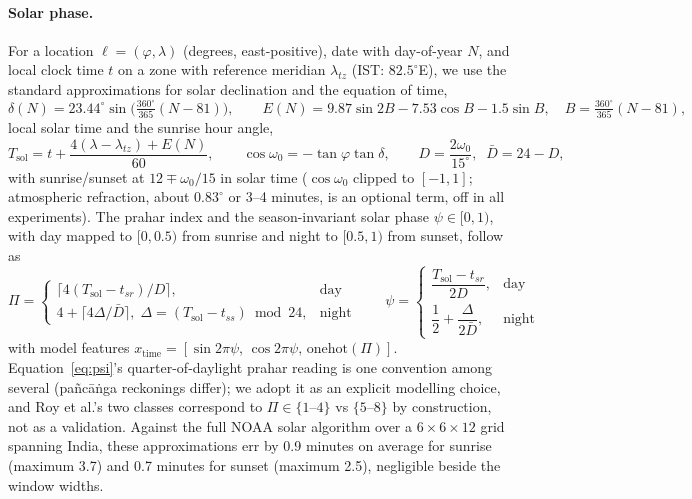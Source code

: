 \documentclass[11pt]{article}
\begin{document}
\paragraph{Solar phase.}
For a location $\ell = (\varphi, \lambda)$ (degrees, east-positive), date
with day-of-year $N$, and local clock time $t$ on a zone with reference
meridian $\lambda_{tz}$ (IST: $82.5^\circ$E), we use the standard
approximations for solar declination and the equation of time,
\begin{equation}
\delta(N)=23.44^{\circ}\sin\!\Big(\tfrac{360^{\circ}}{365}(N-81)\Big),
\qquad
E(N)=9.87\sin 2B-7.53\cos B-1.5\sin B,
\quad B=\tfrac{360^{\circ}}{365}(N-81),
\label{eq:decl}
\end{equation}
local solar time and the sunrise hour angle,
\begin{equation}
T_{\mathrm{sol}}=t+\frac{4(\lambda-\lambda_{tz})+E(N)}{60},
\qquad
\cos\omega_0=-\tan\varphi\tan\delta,
\qquad
D=\frac{2\omega_0}{15^{\circ}},\;\;\bar D=24-D,
\label{eq:sun}
\end{equation}
with sunrise/sunset at $12 \mp \omega_0/15$ in solar time ($\cos\omega_0$
clipped to $[-1,1]$; atmospheric refraction, about $0.83^\circ$ or 3--4
minutes, is an optional term, off in all experiments). The prahar index and
the season-invariant solar phase $\psi \in [0,1)$, with day mapped to
$[0,0.5)$ from sunrise and night to $[0.5,1)$ from sunset, follow as
\begin{equation}
\Pi=\begin{cases}
\big\lceil 4(T_{\mathrm{sol}}-t_{sr})/D\big\rceil, & \text{day}\\[2pt]
4+\big\lceil 4\Delta/\bar D\big\rceil,\;
\Delta=(T_{\mathrm{sol}}-t_{ss})\bmod 24, & \text{night}
\end{cases}
\qquad
\psi=\begin{cases}
\dfrac{T_{\mathrm{sol}}-t_{sr}}{2D}, & \text{day}\\[6pt]
\dfrac12+\dfrac{\Delta}{2\bar D}, & \text{night}
\end{cases}
\label{eq:psi}
\end{equation}
with model features $x_{\mathrm{time}} = [\sin 2\pi\psi,\, \cos 2\pi\psi,\,
\mathrm{onehot}(\Pi)]$. Equation~\eqref{eq:psi}'s quarter-of-daylight prahar
reading is one convention among several (pa\~nc\=a\.nga reckonings differ);
we adopt it as an explicit modelling choice, and Roy et al.'s two classes
correspond to $\Pi \in \{1\text{--}4\}$ vs $\{5\text{--}8\}$ by construction,
not as a validation. Against the full NOAA solar algorithm over a
$6\times6\times12$ grid spanning India, these approximations err by 0.9
minutes on average for sunrise (maximum 3.7) and 0.7 minutes for sunset
(maximum 2.5), negligible beside the window widths.
\end{document}
